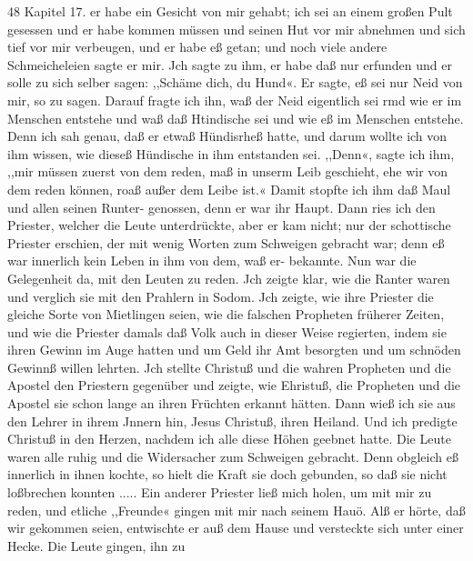48 Kapitel 17.
er habe ein Gesicht von mir gehabt; ich sei an einem großen Pult
gesessen und er habe kommen müssen und seinen Hut vor mir
abnehmen und sich tief vor mir verbeugen, und er habe eß getan;
und noch viele andere Schmeicheleien sagte er mir. Jch sagte
zu ihm, er habe daß nur erfunden und er solle zu sich selber
sagen: ,,Schäme dich, du Hund«. Er sagte, eß sei nur Neid von
mir, so zu sagen. Darauf fragte ich ihn, waß der Neid eigentlich
sei rmd wie er im Menschen entstehe und waß daß Htindische sei
und wie eß im Menschen entstehe. Denn ich sah genau, daß er
etwaß Hündisrheß hatte, und darum wollte ich von ihm wissen,
wie dieseß Hündische in ihm entstanden sei. ,,Denn«, sagte ich
ihm, ,,mir müssen zuerst von dem reden, maß in unserm Leib
geschieht, ehe wir von dem reden können, roaß außer dem Leibe
ist.« Damit stopfte ich ihm daß Maul und allen seinen Runter-
genossen, denn er war ihr Haupt. Dann ries ich den Priester,
welcher die Leute unterdrückte, aber er kam nicht; nur der schottische
Priester erschien, der mit wenig Worten zum Schweigen gebracht
war; denn eß war innerlich kein Leben in ihm von dem, waß er-
bekannte. Nun war die Gelegenheit da, mit den Leuten zu reden.
Jch zeigte klar, wie die Ranter waren und verglich sie mit den
Prahlern in Sodom. Jch zeigte, wie ihre Priester die gleiche
Sorte von Mietlingen seien, wie die falschen Propheten früherer
Zeiten, und wie die Priester damals daß Volk auch in dieser
Weise regierten, indem sie ihren Gewinn im Auge hatten und
um Geld ihr Amt besorgten und um schnöden Gewinnß willen
lehrten. Jch stellte Christuß und die wahren Propheten und die
Apostel den Priestern gegenüber und zeigte, wie Ehristuß, die
Propheten und die Apostel sie schon lange an ihren Früchten
erkannt hätten. Dann wieß ich sie aus den Lehrer in ihrem
Jnnern hin, Jesus Christuß, ihren Heiland. Und ich predigte
Christuß in den Herzen, nachdem ich alle diese Höhen geebnet
hatte. Die Leute waren alle ruhig und die Widersacher zum
Schweigen gebracht. Denn obgleich eß innerlich in ihnen kochte,
so hielt die Kraft sie doch gebunden, so daß sie nicht loßbrechen
konnten .....
Ein anderer Priester ließ mich holen, um mit mir zu reden,
und etliche ,,Freunde« gingen mit mir nach seinem Hauö. Alß
er hörte, daß wir gekommen seien, entwischte er auß dem Hause
und versteckte sich unter einer Hecke. Die Leute gingen, ihn zu


